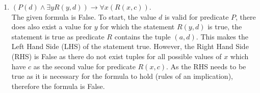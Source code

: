 \documentclass[a4paper]{article}
\begin{document}
\begin{enumerate}
\begin{enumerate}
        \item $(P(d)\wedge\exists yR(y,d))\to\forall x(R(x,c))$.\\
        The given formula is False.
        To start, the value $d$ is valid for predicate $P$, there does also exist a value for $y$ for which the statement $R(y,d)$ is true, the statement is true as predicate $R$ contains the tuple $(a,d)$.
        This makes the Left Hand Side (LHS) of the statement true.
        However, the Right Hand Side (RHS) is False as there do not exist tuples for all possible values of $x$ which have $c$ as the second value for predicate $R(x,c)$.
        As the RHS needs to be true as it is necessary for the formula to hold (rules of an implication), therefore the formula is False.
    \end{enumerate}
\end{enumerate}
\end{document}
